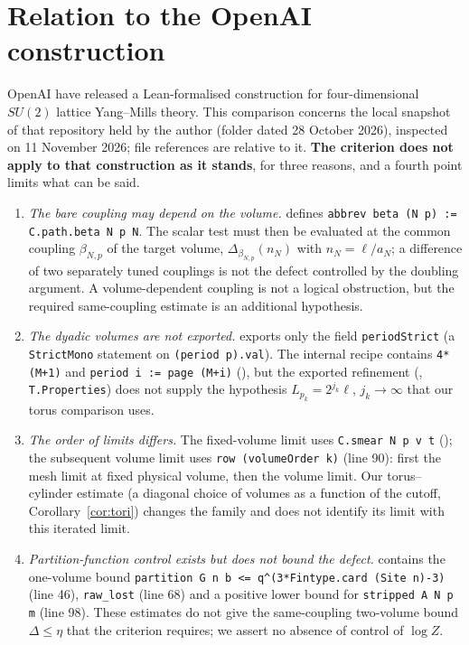 \documentclass[11pt,a4paper]{article}
\theoremstyle{plain}
\theoremstyle{definition}
\theoremstyle{remark}
\numberwithin{equation}{section}
\begin{document}
\section{Relation to the OpenAI construction}\label{sec:openai-construction}
\begingroup\small
OpenAI have released a Lean-formalised construction for four-dimensional $SU(2)$ lattice Yang--Mills theory. This comparison concerns the local
snapshot of that repository held by the author (folder dated 28 October 2026), inspected on 11 November 2026; file references are relative to it.
\textbf{The criterion does not apply to that construction as it stands}, for three reasons, and a fourth point limits what can be said.
\begin{enumerate}
\item \emph{The bare coupling may depend on the volume.}  defines \verb|abbrev beta (N p) := C.path.beta N p N|.
The scalar test must then be evaluated at the common coupling $\beta_{N,p}$ of the target volume, $\Delta_{\beta_{N,p}}(n_N)$ with $n_N=\ell/a_N$;
a difference of two separately tuned couplings is not the defect controlled by the doubling argument. A volume-dependent coupling is not a
logical obstruction, but the required same-coupling estimate is an additional hypothesis.
\item \emph{The dyadic volumes are not exported.}  exports only the field \texttt{periodStrict} (a \texttt{StrictMono} statement on \texttt{(period p).val}).
The internal recipe contains \verb|4*(M+1)| and \verb|period i := page (M+i)| (), but the exported refinement
(, \verb|T.Properties|) does not supply the hypothesis $L_{p_k}=2^{j_k}\ell$, $j_k\to\infty$ that our torus comparison uses.
\item \emph{The order of limits differs.} The fixed-volume limit uses \verb|C.smear N p v t| (); the subsequent volume limit
uses \verb|row (volumeOrder k)| (line 90): first the mesh limit at fixed physical volume, then the volume limit. Our torus--cylinder estimate
(a diagonal choice of volumes as a function of the cutoff, Corollary~\ref{cor:tori}) changes the family and does not identify its limit with this
iterated limit.
\item \emph{Partition-function control exists but does not bound the defect.}  contains the one-volume bound
\verb|partition G n b <= q^(3*Fintype.card (Site n)-3)| (line 46), \verb|raw_lost| (line 68) and a positive lower bound for \verb|stripped A N p m|
(line 98). These estimates do not give the same-coupling two-volume bound $\Delta\le\eta$ that the criterion requires; we assert no absence of
control of $\log Z$.
\end{enumerate}
\end{document}
